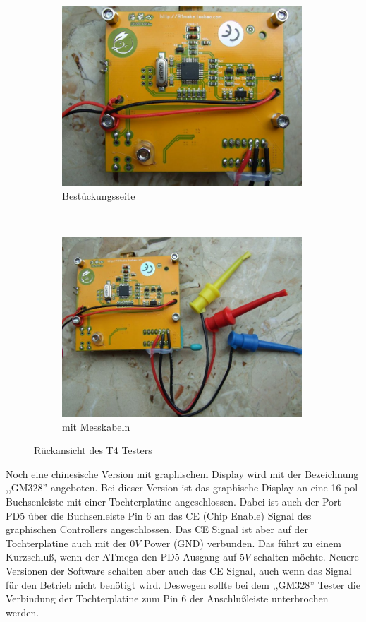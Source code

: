 \begin{figure}[H]
  \begin{subfigure}[b]{9cm}
    \centering
    \includegraphics[width=9cm]{../PNG/T4_back.JPG}
    \caption{Bestückungsseite}
  \end{subfigure}
  ~
  \begin{subfigure}[b]{9cm}
    \centering
    \includegraphics[width=9cm]{../PNG/T4_back_clips.JPG}
    \caption{mit Messkabeln}
  \end{subfigure}
  \caption{Rückansicht des T4 Testers}
  \label{fig:T4_back}
\end{figure}

Noch eine chinesische Version mit graphischem Display wird mit der Bezeichnung ,,GM328'' angeboten.
Bei dieser Version ist das graphische Display an eine 16-pol Buchsenleiste mit einer Tochterplatine
angeschlossen.
Dabei ist auch der Port PD5 über die Buchsenleiste Pin 6 an das CE (Chip Enable) Signal
des graphischen Controllers angeschlossen. Das CE Signal ist aber auf der Tochterplatine auch mit der
\(0V\) Power (GND) verbunden.
Das führt zu einem Kurzschluß, wenn der ATmega den PD5 Ausgang auf \(5V\) schalten möchte.
Neuere Versionen der Software schalten aber auch das CE Signal, auch wenn das Signal für den Betrieb nicht
benötigt wird.
Deswegen sollte bei dem ,,GM328'' Tester die Verbindung der Tochterplatine zum Pin 6 
der Anschlußleiste unterbrochen werden.

